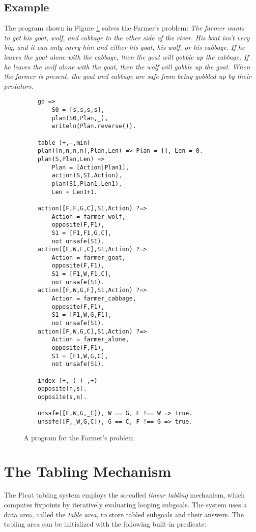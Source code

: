 \subsection*{Example}
The program shown in Figure \ref{fig:farmer} solves the Farmer's problem: {\em The farmer wants to get his goat, wolf, and cabbage to the other side of the river. His boat isn't very big, and it can only carry him and either his goat, his wolf, or his cabbage. If he leaves the goat alone with the cabbage, then the goat will gobble up the cabbage. If he leaves the wolf alone with the goat, then the wolf will gobble up the goat. When the farmer is present, the goat and cabbage are safe from being gobbled up by their predators.}


\begin{figure}
\begin{center}
\begin{verbatim}
    go =>
        S0 = [s,s,s,s],
        plan(S0,Plan,_),
        writeln(Plan.reverse()).

    table (+,-,min)
    plan([n,n,n,n],Plan,Len) => Plan = [], Len = 0.
    plan(S,Plan,Len) =>
        Plan = [Action|Plan1],
        action(S,S1,Action),
        plan(S1,Plan1,Len1),
        Len = Len1+1.
    
    action([F,F,G,C],S1,Action) ?=>
        Action = farmer_wolf,
        opposite(F,F1),
        S1 = [F1,F1,G,C],
        not unsafe(S1).
    action([F,W,F,C],S1,Action) ?=>
        Action = farmer_goat,
        opposite(F,F1),
        S1 = [F1,W,F1,C],
        not unsafe(S1).
    action([F,W,G,F],S1,Action) ?=>
        Action = farmer_cabbage,
        opposite(F,F1),
        S1 = [F1,W,G,F1],
        not unsafe(S1).
    action([F,W,G,C],S1,Action) ?=>
        Action = farmer_alone,
        opposite(F,F1),
        S1 = [F1,W,G,C],
        not unsafe(S1).

    index (+,-) (-,+)
    opposite(n,s).
    opposite(s,n).

    unsafe([F,W,G,_C]), W == G, F !== W => true.
    unsafe([F,_W,G,C]), G == C, F !== G => true.
\end{verbatim}
\end{center}
\caption{\label{fig:farmer}A program for the Farmer's problem.}
\end{figure}

\section{The Tabling Mechanism}
The Picat tabling system employs the so-called \emph{linear tabling} mechanism, which computes fixpoints by iteratively evaluating looping subgoals. The system uses a data area, called the \emph{table area}, to store tabled subgoals and their answers. The tabling area can be initialized with the following built-in predicate:

